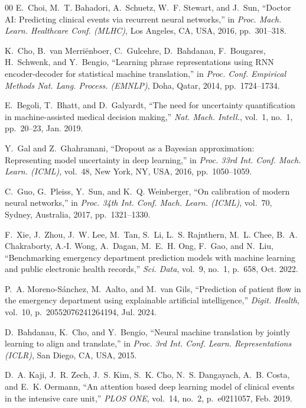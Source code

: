 \documentclass[conference]{IEEEtran}
\begin{document}
\begin{thebibliography}{00}
E.~Choi, M.~T. Bahadori, A.~Schuetz, W.~F. Stewart, and J.~Sun, ``Doctor AI: Predicting clinical events via recurrent neural networks,'' in \textit{Proc. Mach. Learn. Healthcare Conf. (MLHC)}, Los Angeles, CA, USA, 2016, pp.~301--318.

K.~Cho, B.~van Merri\"{e}nboer, C.~Gulcehre, D.~Bahdanau, F.~Bougares, H.~Schwenk, and Y.~Bengio, ``Learning phrase representations using RNN encoder-decoder for statistical machine translation,'' in \textit{Proc. Conf. Empirical Methods Nat. Lang. Process. (EMNLP)}, Doha, Qatar, 2014, pp.~1724--1734.

E.~Begoli, T.~Bhatt, and D.~Galyardt, ``The need for uncertainty quantification in machine-assisted medical decision making,'' \textit{Nat. Mach. Intell.}, vol.~1, no.~1, pp.~20--23, Jan. 2019.

Y.~Gal and Z.~Ghahramani, ``Dropout as a Bayesian approximation: Representing model uncertainty in deep learning,'' in \textit{Proc. 33rd Int. Conf. Mach. Learn. (ICML)}, vol.~48, New York, NY, USA, 2016, pp.~1050--1059.

C.~Guo, G.~Pleiss, Y.~Sun, and K.~Q. Weinberger, ``On calibration of modern neural networks,'' in \textit{Proc. 34th Int. Conf. Mach. Learn. (ICML)}, vol.~70, Sydney, Australia, 2017, pp.~1321--1330.

F.~Xie, J.~Zhou, J.~W. Lee, M.~Tan, S.~Li, L.~S. Rajnthern, M.~L. Chee, B.~A. Chakraborty, A.-I. Wong, A.~Dagan, M.~E.~H. Ong, F.~Gao, and N.~Liu, ``Benchmarking emergency department prediction models with machine learning and public electronic health records,'' \textit{Sci. Data}, vol.~9, no.~1, p.~658, Oct. 2022.

P.~A. Moreno-S\'{a}nchez, M.~Aalto, and M.~van Gils, ``Prediction of patient flow in the emergency department using explainable artificial intelligence,'' \textit{Digit. Health}, vol.~10, p.~20552076241264194, Jul. 2024.

D.~Bahdanau, K.~Cho, and Y.~Bengio, ``Neural machine translation by jointly learning to align and translate,'' in \textit{Proc. 3rd Int. Conf. Learn. Representations (ICLR)}, San Diego, CA, USA, 2015.

D.~A. Kaji, J.~R. Zech, J.~S. Kim, S.~K. Cho, N.~S. Dangayach, A.~B. Costa, and E.~K. Oermann, ``An attention based deep learning model of clinical events in the intensive care unit,'' \textit{PLOS ONE}, vol.~14, no.~2, p.~e0211057, Feb. 2019.


\end{thebibliography}
\end{document}
